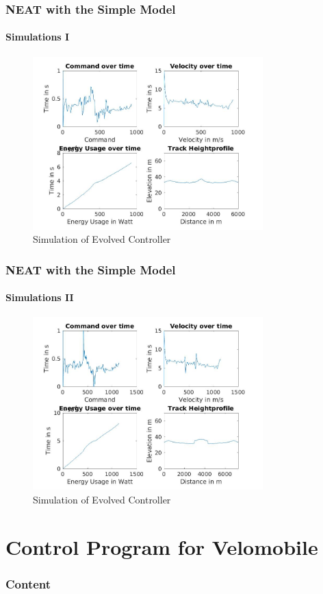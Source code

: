 \documentclass[8pt]{beamer}
\begin{document}
\begin{frame}
	\frametitle{NEAT with the Simple Model}
	\framesubtitle{Simulations I}
	\begin{figure}[hb]
  		\centering
  		\includegraphics[width=3.5in]{images/result8.jpg}
  		\caption[Simulation of Evolved Controller]
   		{Simulation of Evolved Controller}
		\end{figure}
\end{frame}

\begin{frame}
	\frametitle{NEAT with the Simple Model}
	\framesubtitle{Simulations II}
	\begin{figure}[hb]
  		\centering
  		\includegraphics[width=3.5in]{images/result7.jpg}
  		\caption[Simulation of Evolved Controller]
   		{Simulation of Evolved Controller}
		\end{figure}
\end{frame}


\section{Control Program for Velomobile}
\begin{frame}
	\frametitle{Content}
\end{frame}
\end{document}
